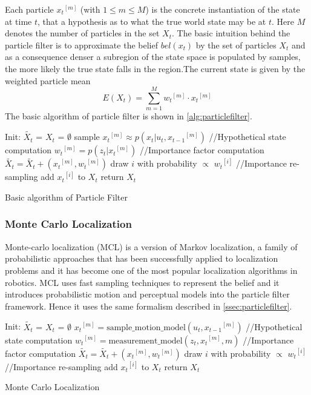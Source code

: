 {	Each particle ${x_t}^{[m]}$ (with $1 \leq m \leq M$) is the concrete instantiation of the state at time $t$, that a hypothesis as to what the true world state may be at $t$. Here $M$ denotes the number of particles in the set $X_t$. The basic intuition behind the particle filter is to approximate the belief $bel(x_t)$ by the set of particles $X_t$ and as a consequence denser a subregion of the state space is populated by samples, the more likely the true state falls in the region.The current state is given by the weighted particle mean 
\begin{equation}
E(X_t) = \sum_{m=1}^{M} {w_t}^{[m]}\cdot {x_t}^{[m]}
\end{equation}
The basic algorithm of particle filter is shown in \ref{alg:particlefilter}.\\ 
\begin{algorithm}
Init: {$\tilde{X_t}$ = $X_t$ = $\emptyset$ } \;
  { 
   sample ${x_t}^{[m]} \approx p(x_t \vert u_t,{x_{t-1}}^{[m]}) $ //Hypothetical state computation \;
   ${w_t}^{[m]} = p(z_t \vert {x_t}^{[m]} )$ //Importance factor computation\;
   $\tilde{X_t} = \tilde{X_t} + ({x_t}^{[m]},{w_t}^{[m]})$ \;
 }
  { 
   draw $i$ with probability $\varpropto$ ${w_t}^{[i]}$ //Importance re-sampling\;
   add ${x_t}^{[i]}$ to $X_t$ \;
 }
 return $X_t$
 \caption{Basic algorithm of Particle Filter}
 \label{alg:particlefilter}
\end{algorithm}
\subsubsection{Monte Carlo Localization}
\label{ssec:montecarlo}
	Monte-carlo localization (MCL) \cite{fox1999monte} is a version of Markov localization, a family of probabilistic approaches that has been successfully applied to localization problems and it has become one of the most popular localization algorithms in robotics. MCL uses fast sampling techniques to represent the belief and it introduces probabilistic motion and perceptual models into the particle filter framework. Hence it uses the same formalism described in \ref{ssec:particlefilter}.\\  	
\begin{algorithm}
Init: {$\tilde{X_t}$ = $X_t$ = $\emptyset$ } \;
  { 
   ${x_t}^{[m]} = \text{sample\_motion\_model}(u_t,{x_{t-1}}^{[m]})$ //Hypothetical state computation\;
   ${w_t}^{[m]} = \text{measurement\_model}(z_t,{x_t}^{[m]},m)$ //Importance factor computation \; 
   $\tilde{X_t} = \tilde{X_t} + ({x_t}^{[m]},{w_t}^{[m]})$ \;
 }
  { 
   draw $i$ with probability $\varpropto$ ${w_t}^{[i]}$ //Importance re-sampling\;
   add ${x_t}^{[i]}$ to $X_t$ \;
 }
 return $X_t$
 \caption{Monte Carlo Localization}
 \label{alg:montecarlo}
\end{algorithm}

}
